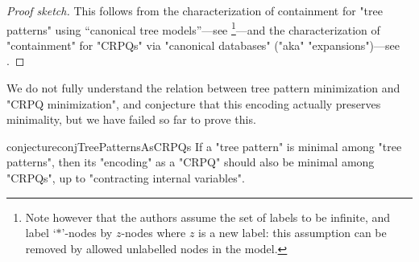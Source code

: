 \begin{proof}[Proof sketch]
	This follows from the characterization of containment for "tree patterns"
	using ``canonical tree models''---see \cite[\S4.2]{CzerwinskiMartensNiewerthParys2018Minimization}\footnote{Note
	however that the authors assume the set of labels to be infinite, and label `$*$'-nodes
	by $z$-nodes where $z$ is a new label: this assumption can be removed by
	allowed unlabelled nodes in the model.}---and the characterization of "containment" for "CRPQs"
	via "canonical databases" ("aka" "expansions")---see .
\end{proof}

We do not fully understand the relation between tree pattern minimization and "CRPQ minimization", 
and conjecture that this encoding actually preserves minimality, but we have failed so far to prove this. 

\begin{restatable}{conjecture}{conjTreePatternsAsCRPQs}
	If a "tree pattern" is minimal among "tree patterns", 
	then its "encoding" as a "CRPQ" should also be minimal among "CRPQs", up to "contracting internal variables".
\end{restatable}